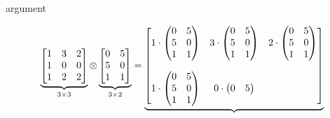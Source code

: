 \begin{labeling}{argument}
    \begin{sol}
        \begin{align*}
            \underbrace{%
                \begin{bmatrix}
                    1 & 3 & 2 \\
                    1 & 0 & 0 \\
                    1 & 2 & 2
                \end{bmatrix}%
            }_{3 \times 3}
            \otimes
            \underbrace{%
                \begin{bmatrix}
                    0 & 5 \\
                    5 & 0 \\
                    1 & 1
                \end{bmatrix}%
            }_{3 \times 2}
            =
            \underbrace{%
                \begin{bmatrix}
                    1\cdot\begin{pmatrix}
                              0 & 5 \\
                              5 & 0 \\
                              1 & 1
                          \end{pmatrix}
                     & 3\cdot\begin{pmatrix}
                                 0 & 5 \\
                                 5 & 0 \\
                                 1 & 1
                             \end{pmatrix}
                     & 2\cdot\begin{pmatrix}
                                 0 & 5 \\
                                 5 & 0 \\
                                 1 & 1
                             \end{pmatrix}
                    \\[0.8cm]
                    1\cdot\begin{pmatrix}
                              0 & 5 \\
                              5 & 0 \\
                              1 & 1
                          \end{pmatrix}
                     & 0\cdot\begin{pmatrix}
                                 0 & 5 \\

\end{pmatrix}
\end{bmatrix}}
\end{align*}
\end{sol}
\end{labeling}
